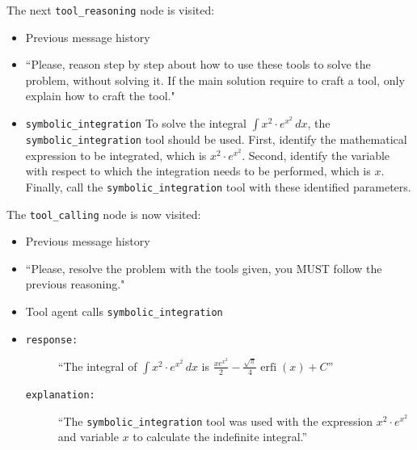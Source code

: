 \documentclass[12pt,a4paper,openright,twoside]{book}
\begin{document}
The next \texttt{tool\_reasoning} node is visited:
\begin{itemize}
    \item[\textbf{PMH:}] Previous message history
    \item[\textbf{Node Prompt:}] ``Please, reason step by step about how to use these tools to solve the problem, without solving it. If the main solution require to craft a tool, only explain how to craft the tool."
    \item[\textbf{AI:}] \texttt{symbolic\_integration} To solve the integral $\int x^2 \cdot e^{x^2} \, dx$, the \texttt{symbolic\_integration} tool should be used. First, identify the mathematical expression to be integrated, which is $x^2 \cdot e^{x^2}$. Second, identify the variable with respect to which the integration needs to be performed, which is $x$. Finally, call the \texttt{symbolic\_integration} tool with these identified parameters.
\end{itemize}

The \texttt{tool\_calling} node is now visited:

\begin{itemize}
    \item[\textbf{PMH:}] Previous message history
    \item[\textbf{System:}] ``Please, resolve the problem with the tools given, you MUST follow the previous reasoning."
    \item[\textbf{AI:}] Tool agent calls \texttt{symbolic\_integration} 
    \item[\textbf{AI:}] 
    \begin{description}
        \item[\texttt{response:}] ``The integral of $\int x^2 \cdot e^{x^2} \, dx$ is $\frac{x e^{x^2}}{2} - \frac{\sqrt{\pi}}{4} \operatorname{erfi}(x) + C$'' 
        \item[\texttt{explanation:}] ``The \texttt{symbolic\_integration} tool was used with the expression $x^2 \cdot e^{x^2}$ and variable $x$ to calculate the indefinite integral.''
    \end{description}
\end{itemize}
\end{document}
